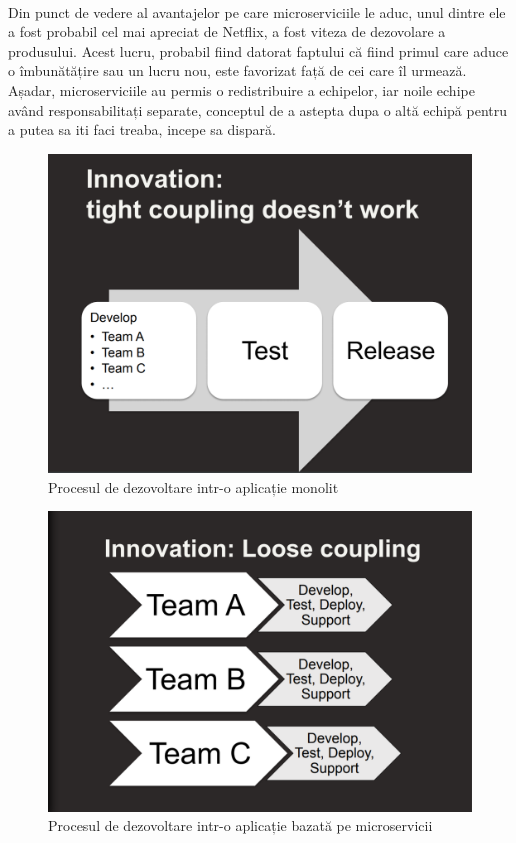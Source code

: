 \documentclass[12pt]{report}
\begin{document}
	\paragraph{}Din punct de vedere al avantajelor pe care microserviciile le aduc, unul dintre ele a fost probabil cel mai apreciat de Netflix, a fost viteza de dezovolare a produsului. Acest lucru, probabil fiind datorat faptului că fiind primul care aduce o îmbunătățire sau un lucru nou, este favorizat față de cei care îl urmează. Așadar, microserviciile au permis o redistribuire a echipelor, iar noile echipe având responsabilitați separate, conceptul de a astepta dupa o altă echipă pentru a putea sa iti faci treaba, incepe sa dispară.
	\begin{figure}[h]
  	\centering
  	\includegraphics[scale=.4]{tightCoupling}
	\caption{Procesul de dezovoltare intr-o aplicație monolit \cite{ruslan}}  
	\label{tightCoupling}
  	\end{figure}
  	\begin{figure}[h]
  	\centering
  	\includegraphics[scale=.4]{looseCoupling}
	\caption{Procesul de dezovoltare intr-o aplicație bazată pe microservicii \cite{ruslan}}  
	\label{looseCoupling}
  	\end{figure}
\end{document}
